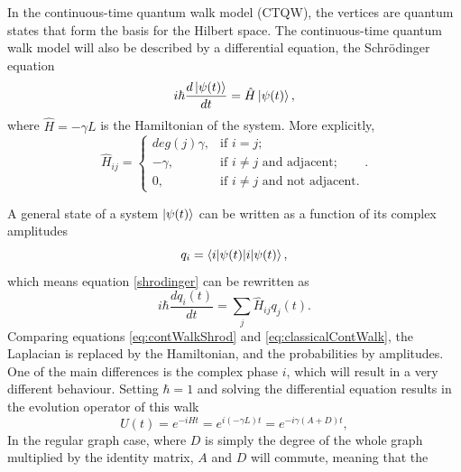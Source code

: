 \documentclass[../../dissertation.tex]{subfiles}
\begin{document}
In the continuous-time quantum walk model (CTQW), the vertices are quantum
states that form the basis for the Hilbert space. The continuous-time quantum
walk model will also be described by a differential equation, the Schrödinger
equation
\begin{equation}
	i\hbar \frac{d\ket{\psi(t)}}{dt} = \hat{H} \ket{\psi(t)}, \label{shrodinger}
\end{equation}
where $\hat{H} = -\gamma L$ is the Hamiltonian of the system. More explicitly,
\begin{equation}
	\hat{H}_{ij} = \begin{cases} 
		deg(j)\gamma, & \mbox{if } i= j; \\ 
		-\gamma, & \mbox{if } i\neq j\mbox{ and adjacent};\\
		0, & \mbox{if } i\neq j\mbox{ and not adjacent}.
	\end{cases}.
	\label{Hamilt}
\end{equation}\par
A general state of a system $\ket{\psi(t)}$ can be written as a function of
its complex amplitudes 
\begin{equation}
	q_i = \braket{i|\psi(t)},
\end{equation}
which means equation \eqref{shrodinger} can be rewritten as 
\begin{equation}
	i\hbar \frac{dq_i(t)}{dt} = \sum_j \hat{H}_{ij} q_j(t).
	\label{eq:contWalkShrod}
\end{equation}
Comparing equations \eqref{eq:contWalkShrod} and \eqref{eq:classicalContWalk}, the
Laplacian is replaced by the Hamiltonian, and the probabilities by
amplitudes. One of the main differences is the complex phase $i$, which will
result in a very different behaviour. 
Setting $\hbar = 1$ and solving the differential equation results in the
evolution operator of this walk 
\begin{equation}
	U(t) = e^{-iHt} = e^{i(-\gamma L)t} = e^{-i\gamma(A+D)t},
\end{equation}
In the regular graph case, where $D$ is simply the degree of the whole graph
multiplied by the identity matrix, $A$ and $D$ will commute, meaning that the
\end{document}
